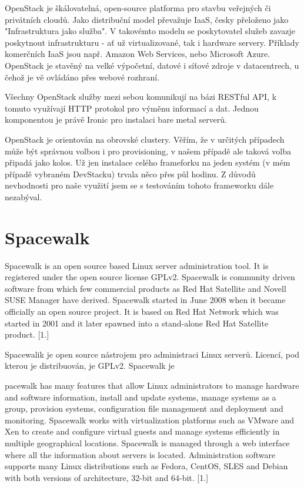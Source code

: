 \documentclass[thesis=B,czech]{FITthesis}[2012/06/26]
\begin{document}
OpenStack je škálovatelná, open-source platforma pro stavbu veřejných či privátních cloudů. Jako distribuční model převažuje IaaS, česky přeloženo jako "Infrastruktura jako služba". V takovémto modelu se poskytovatel služeb zavazje poskytnout infrastrukturu - ať už virtualizované, tak i hardware servery. Příklady komerčních IaaS jsou např. Amazon Web Services, nebo Microsoft Azure.  OpenStack je stavěný na velké výpočetní, datové i síťové zdroje v datacentrech, u čehož je vě ovládáno přes webové rozhraní.

Všechny OpenStack služby mezi sebou komunikují na bázi RESTful API, k tomuto využívají HTTP protokol pro výměnu informací a dat. Jednou komponentou je právě Ironic pro instalaci bare metal serverů. 

OpenStack je orientován na obrovské clustery. Věřím, že v určitých případech může být správnou volbou i pro provisioning, v našem případě ale taková volba připadá jako kolos. Už jen instalace celého frameforku na jeden systém (v mém případě vybraném DevStacku) trvala něco přes půl hodinu. Z důvodů nevhodnosti pro naše využití jsem se s testováním tohoto frameworku dále nezabýval.


\section{Spacewalk}


Spacewalk is an open source based Linux server administration tool. It is registered
under the open source license GPLv2. Spacewalk is community driven software from
which few commercial products as Red Hat Satellite and Novell SUSE Manager have
derived. Spacewalk started in June 2008 when it became officially an open source
project. It is based on Red Hat Network which was started in 2001 and it later spawned
into a stand-alone Red Hat Satellite product. [1.]

Spacewalik je open source nástrojem pro administraci Linux serverů. Licencí, pod kterou je distribuován, je GPLv2. Spacewalk je

pacewalk has many features that allow Linux administrators to manage hardware and
software information, install and update systems, manage systems as a group,
provision systems, configuration file management and deployment and monitoring.
Spacewalk works with virtualization platforms such as VMware and Xen to create and
configure virtual guests and manage systems efficiently in multiple geographical
locations. Spacewalk is managed through a web interface where all the information
about servers is located. Administration software supports many Linux distributions
such as Fedora, CentOS, SLES and Debian with both versions of architecture, 32-bit
and 64-bit. [1.]
\end{document}

